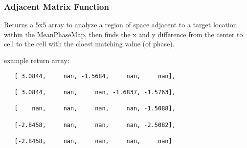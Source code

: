 \documentclass[11pt]{article}
\begin{document}
    \subsubsection{Adjacent Matrix Function}\label{adjacent-matrix-function}

Returns a 5x5 array to analyze a region of space adjacent to a target
location within the MeanPhaseMap, then finds the x and y difference from
the center to cell to the cell with the cloest matching value (of
phase).

example return array:

\begin{verbatim}
   [ 3.0844,     nan, -1.5684,     nan,     nan],

   [ 3.0844,     nan,     nan, -1.6837, -1.5763],
   
   [    nan,     nan,     nan,     nan, -1.5088],
   
   [-2.8458,     nan,     nan,     nan, -2.5082],
   
   [-2.8458,     nan,     nan,     nan,     nan]
\end{verbatim}
\end{document}
